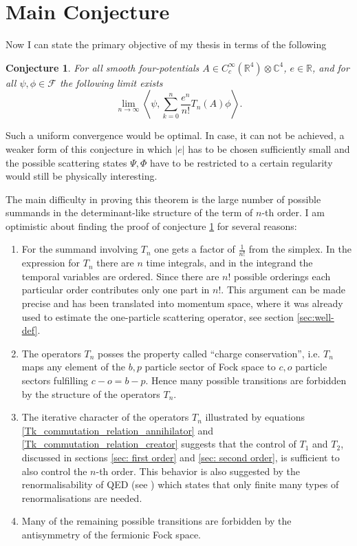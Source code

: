 \documentclass[b5paper,draft,openbib,12pt]{memoir}
\newtheorem{Conj}[Def]{Conjecture}
\begin{document}
\section{Main Conjecture}\label{sec:main result}
Now I can state the primary objective of my thesis in terms of the following
\begin{Conj}\label{main_result}
For all smooth four-potentials \(A\in C_{c}^\infty(\mathbb{R}^4)\otimes
\mathbb{C}^4\),
\(e \in \mathbb{R}\), and for all \(\psi, \phi \in
\mathcal{F}\) the following limit exists
\begin{equation}
\lim_{n\rightarrow \infty} \left\langle \psi, \sum_{k=0}^n  \frac{e^n}{n!} T_n (A)\phi \right\rangle.
\end{equation}
\end{Conj}

Such a uniform convergence would be optimal. In case, it can not be achieved, a
weaker form of this conjecture in which $|e|$ has to be chosen sufficiently
small and the possible scattering states $\Psi,\Phi$ have to be restricted to a
certain regularity would still be physically interesting.

The main difficulty in proving this theorem is the large number of  possible
summands in the determinant-like structure of the term of \(n\)-th order.  I am
optimistic about finding the proof of conjecture \ref{main_result} for several
reasons:

\begin{enumerate}
\item For the summand involving \(T_n\) one gets a factor of \(\frac{1}{n!}\)
    from the simplex. In the expression for \(T_n\) there are \(n\) time
    integrals, and in the integrand the temporal variables are ordered. Since
    there are \(n!\) possible orderings each particular order contributes only
    one part in \(n!\). This argument can be made precise and has been
    translated into momentum space, where it was already used to estimate the
    one-particle scattering operator, see section \ref{sec:well-def}.
\item The operators \(T_n\) posses the property called ``charge conservation'',
    i.e. \(T_n\) maps any element of the \(b,p\) particle sector of Fock space
    to \(c,o\) particle sectors fulfilling \(c-o=b-p\). Hence many possible
    transitions are forbidden by the structure of the operators \(T_n\).
\item The iterative character of the operators \(T_n\) illustrated by equations \eqref{Tk_commutation_relation_annihilator} and \eqref{Tk_commutation_relation_creator} suggests that
    the control of $T_1$ and $T_2$, discussed in sections \ref{sec: first order} and \ref{sec: second order},
    is sufficient to also control the $n$-th
    order. This behavior is also suggested by the renormalisability of QED (see \cite[Chapter
    4.3]{scharf2014finite}) which states that only finite many types of renormalisations
    are needed.
\item Many of the remaining possible transitions are forbidden by the
    antisymmetry of the fermionic Fock space.
\end{enumerate}
\end{document}
